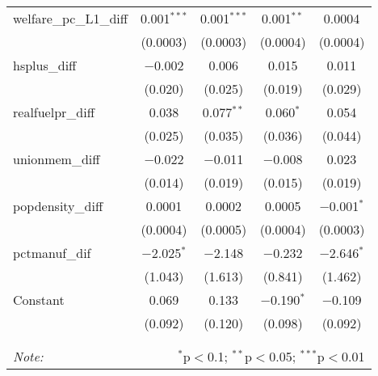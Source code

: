 \begin{table}[!htbp]
\begin{tabular}{@{\extracolsep{5pt}}lcccc}
  welfare\_pc\_L1\_diff & 0.001$^{***}$ & 0.001$^{***}$ & 0.001$^{**}$ & 0.0004 \\ 
  & (0.0003) & (0.0003) & (0.0004) & (0.0004) \\ 
  hsplus\_diff & $-$0.002 & 0.006 & 0.015 & 0.011 \\ 
  & (0.020) & (0.025) & (0.019) & (0.029) \\ 
  realfuelpr\_diff & 0.038 & 0.077$^{**}$ & 0.060$^{*}$ & 0.054 \\ 
  & (0.025) & (0.035) & (0.036) & (0.044) \\ 
  unionmem\_diff & $-$0.022 & $-$0.011 & $-$0.008 & 0.023 \\ 
  & (0.014) & (0.019) & (0.015) & (0.019) \\ 
  popdensity\_diff & 0.0001 & 0.0002 & 0.0005 & $-$0.001$^{*}$ \\ 
  & (0.0004) & (0.0005) & (0.0004) & (0.0003) \\ 
  pctmanuf\_dif & $-$2.025$^{*}$ & $-$2.148 & $-$0.232 & $-$2.646$^{*}$ \\ 
  & (1.043) & (1.613) & (0.841) & (1.462) \\ 
  Constant & 0.069 & 0.133 & $-$0.190$^{*}$ & $-$0.109 \\ 
  & (0.092) & (0.120) & (0.098) & (0.092) \\ 
 \hline \\[-1.8ex] 
\hline 
\hline \\[-1.8ex] 
\textit{Note:}  & \multicolumn{4}{r}{$^{*}$p$<$0.1; $^{**}$p$<$0.05; $^{***}$p$<$0.01} \\ 
\end{tabular} 
\end{table} 
